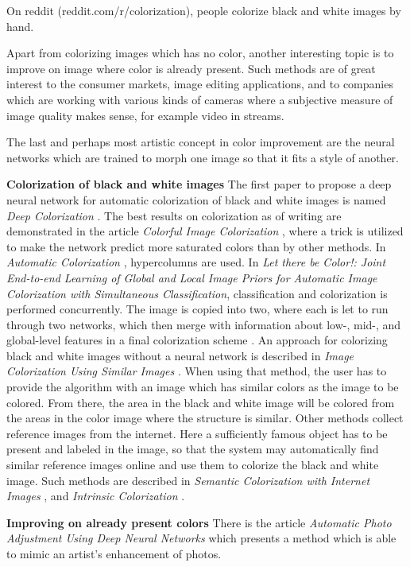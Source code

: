 On reddit (reddit.com/r/colorization), people colorize black and white images by hand.

Apart from colorizing images which has no color, another interesting topic is to improve on image where color is already present. Such methods are of great interest to the consumer markets, image editing applications, and to companies which are working with various kinds of cameras where a subjective measure of image quality makes sense, for example video in streams. 

The last and perhaps most artistic concept in color improvement are the neural networks which are trained to morph one image so that it fits a style of another. 


\textbf{Colorization of black and white images}
The first paper to propose a deep neural network for automatic colorization of black and white images is named \emph{Deep Colorization} \citep{Deep-colorization}. The best results on colorization as of writing are demonstrated in the article \emph{Colorful Image Colorization} \citep{Colorful-colorization}, where a trick is utilized to make the network predict more saturated colors than by other methods. In \emph{Automatic Colorization} \citep{Automatic-colorization}, hypercolumns are used. In \emph{Let there be Color!: Joint End-to-end Learning of Global and Local Image Priors for Automatic Image Colorization with Simultaneous Classification}, classification and colorization is performed concurrently. The image is copied into two, where each is let to run through two networks, which then merge with information about low-, mid-, and global-level features in a final colorization scheme \citep{Lettherebecolor}. An approach for colorizing black and white images without a neural network is described in \emph{Image Colorization Using Similar Images} \citep{Gupta}. When using that method, the user has to provide the algorithm with an image which has similar colors as the image to be colored. From there, the area in the black and white image will be colored from the areas in the color image where the structure is similar. Other methods collect reference images from the internet. Here a sufficiently famous object has to be present and labeled in the image, so that the system may automatically find similar reference images online and use them to colorize the black and white image. Such methods are described in \emph{Semantic Colorization with Internet Images} \citep{Semantic-Internet}, and \emph{Intrinsic Colorization} \citep{2008-intrinsic}.


\textbf{Improving on already present colors}
There is the article \emph{Automatic Photo Adjustment Using Deep Neural Networks} \citep{Automatic-adjustment} which presents a method which is able to mimic an artist's enhancement of photos.

